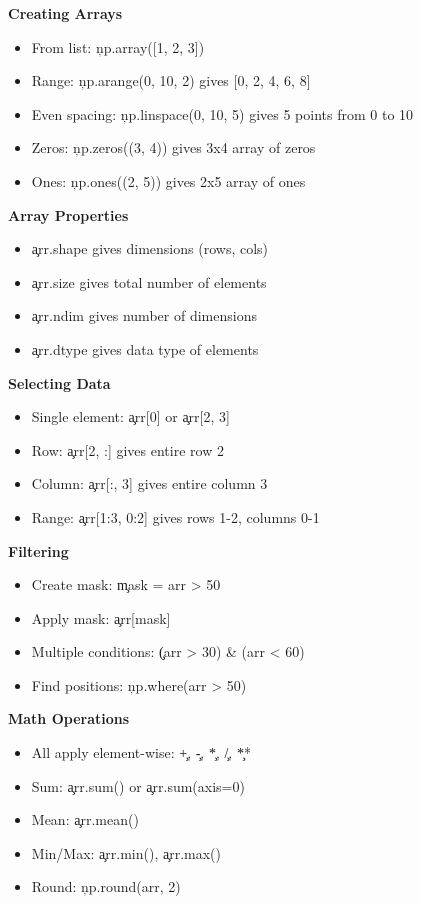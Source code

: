 \begin{tcolorbox}[
    title=NumPy Essentials for Architects,
    colframe=blue,
    colback = white,
    arc=2mm
]
\textbf{Creating Arrays}
\begin{itemize}
\item From list: \c{np.array([1, 2, 3])}
\item Range: \c{np.arange(0, 10, 2)} gives [0, 2, 4, 6, 8]
\item Even spacing: \c{np.linspace(0, 10, 5)} gives 5 points from 0 to 10
\item Zeros: \c{np.zeros((3, 4))} gives 3x4 array of zeros
\item Ones: \c{np.ones((2, 5))} gives 2x5 array of ones
\end{itemize}

\textbf{Array Properties}
\begin{itemize}
\item \c{arr.shape} gives dimensions (rows, cols)
\item \c{arr.size} gives total number of elements
\item \c{arr.ndim} gives number of dimensions
\item \c{arr.dtype} gives data type of elements
\end{itemize}

\textbf{Selecting Data}
\begin{itemize}
\item Single element: \c{arr[0]} or \c{arr[2, 3]}
\item Row: \c{arr[2, :]} gives entire row 2
\item Column: \c{arr[:, 3]} gives entire column 3
\item Range: \c{arr[1:3, 0:2]} gives rows 1-2, columns 0-1
\end{itemize}

\textbf{Filtering}
\begin{itemize}
\item Create mask: \c{mask = arr > 50}
\item Apply mask: \c{arr[mask]}
\item Multiple conditions: \c{(arr > 30) \& (arr < 60)}
\item Find positions: \c{np.where(arr > 50)}
\end{itemize}

\textbf{Math Operations}
\begin{itemize}
\item All apply element-wise: \c{+}, \c{-}, \c{*}, \c{/}, \c{**}
\item Sum: \c{arr.sum()} or \c{arr.sum(axis=0)}
\item Mean: \c{arr.mean()}
\item Min/Max: \c{arr.min()}, \c{arr.max()}
\item Round: \c{np.round(arr, 2)}
\end{itemize}


\end{tcolorbox}
